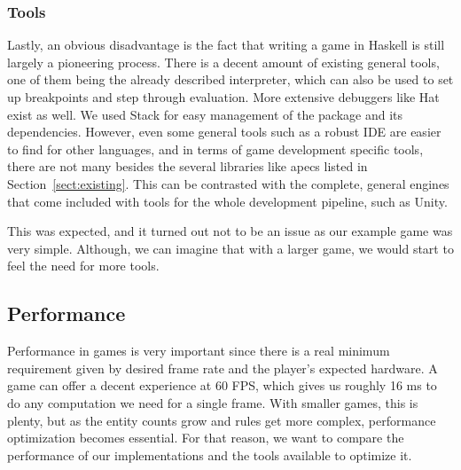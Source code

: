 \documentclass[
  digital, %
  color,   %
  table,   %
  oneside, %
  lof,     %
  lot,     %
]{fithesis3}
\begin{document}
{\subsubsection{Tools}
Lastly, an obvious disadvantage is the fact that writing a game in Haskell
is still largely a pioneering process. There is a decent amount of existing general tools,
one of them being the already described interpreter,
which can also be used to set up breakpoints and step through evaluation.
More extensive debuggers like Hat exist as well. We used Stack for easy management of
the package and its dependencies. However, even some general tools such as a robust IDE
are easier to find for other languages, and in terms of game development specific tools,
there are not many besides the several libraries like apecs listed in Section~\ref{sect:existing}.
This can be contrasted with the complete, general engines that come included with 
tools for the whole development pipeline, such as Unity.

This was expected, and it turned out not to be an issue as our example game was
very simple. Although, we can imagine that with a larger game, we would start
to feel the need for more tools.



\subsection{Performance}

Performance in games is very important since there is a real minimum requirement
given by desired frame rate and the player's expected hardware. A game can offer
a decent experience at 60 FPS, which gives us roughly 16 ms to do any computation
we need for a single frame. With smaller games, this is plenty, but as the entity
counts grow and rules get more complex, performance optimization becomes essential.
For that reason, we want to compare the performance of our implementations and
the tools available to optimize it.

}
\end{document}
